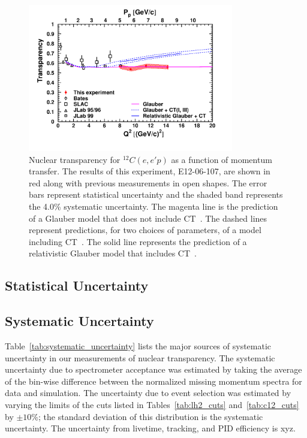 \begin{figure}[!h]
    \centering
    \includegraphics[width=0.8\textwidth]{chap5/c12_results.pdf}
    \caption{
            Nuclear transparency for ${}^{12}C(e,e'p)$ as a function of
            momentum transfer.
            The results of this experiment, E12-06-107, are shown in red along
            with previous measurements in open shapes.
            The error bars represent statistical uncertainty and the
            shaded band represents the 4.0\% systematic uncertainty.
            The magenta line is the prediction of a Glauber
            model that does not include CT~\cite{Pandharipande_1992}.
            The dashed lines represent predictions, for two choices of
            parameters, of a model including CT~\cite{Frankfurt_1995_PRC}.
            The solid line represents the prediction of a relativistic Glauber
            model that includes CT~\cite{Cosyn_2006}.
            }
    \label{fig:c12_transparency_results}
\end{figure}

\subsection{Statistical Uncertainty}

\subsection{Systematic Uncertainty}

Table~\ref{tab:systematic_uncertainty} lists the major sources of systematic
uncertainty in our measurements of nuclear transparency.
The systematic uncertainty due to spectrometer acceptance was estimated by
taking the average of the bin-wise difference between the normalized missing
momentum spectra for data and simulation.
The uncertainty due to event selection was estimated by varying the limits of the
cuts listed in Tables~\ref{tab:lh2_cuts} and~\ref{tab:c12_cuts} by $\pm10\%$;
the standard deviation of this distribution is the systematic uncertainty.
The uncertainty from livetime, tracking, and PID efficiency is xyz.


